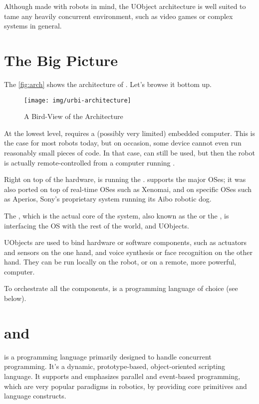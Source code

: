 Although made with robots in mind, the UObject architecture is well suited
to tame any heavily concurrent environment, such as video games or complex
systems in general.

\section{The Big Picture}

The \autoref{fig:arch} shows the architecture of \urbi.  Let's browse it
bottom up.

\begin{figure}[p]
  \centering
  \texttt{[image: img/urbi-architecture]}
  \caption{A Bird-View of the \urbi Architecture}
  \label{fig:arch}
\end{figure}

At the lowest level, \urbi requires a (possibly very limited) embedded
computer.  This is the case for most robots today, but on occasion, some
device cannot even run reasonably small pieces of code.  In that case, \urbi
can still be used, but then the robot is actually remote-controlled from a
computer running \urbi.

Right on top of the hardware, is running the .  \urbi
supports the major OSes; it was also ported on top of real-time OSes such as
Xenomai, and on specific OSes such as Aperios, Sony's proprietary system
running its Aibo robotic dog.

The , which is the actual core of the system, also known
as the  or the , is interfacing the OS with the rest
of the \urbi world, \us and UObjects.

UObjects are used to bind hardware or software components, such as actuators
and sensors on the one hand, and voice synthesis or face recognition on the
other hand.  They can be run locally on the robot, or on a remote, more
powerful, computer.

To orchestrate all the components, \us is a programming language of choice
(see below).

\section{\urbi and \us}

\us is a programming language primarily designed to handle concurrent programming. It's a
dynamic, prototype-based, object-oriented scripting language. It supports
and emphasizes parallel and event-based programming, which are very popular
paradigms in robotics, by providing core primitives and language constructs.

